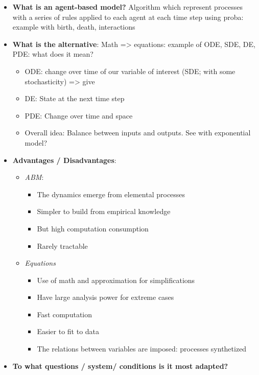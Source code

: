 \documentclass[
]{book}
\providecommand{\tightlist}{%
  \setlength{\itemsep}{0pt}\setlength{\parskip}{0pt}}
\theoremstyle{definition}
\theoremstyle{definition}
\theoremstyle{definition}
\theoremstyle{definition}
\theoremstyle{remark}
\begin{document}
\begin{itemize}
\tightlist
\item
  \textbf{What is an agent-based model?} Algorithm which represent processes with a series of rules applied to each agent at each time step using proba: example with birth, death, interactions
\item
  \textbf{What is the alternative}: Math =\textgreater{} equations: example of ODE, SDE, DE, PDE: what does it mean?

  \begin{itemize}
  \tightlist
  \item
    ODE: change over time of our variable of interest (SDE; with some stochasticity) =\textgreater{} give
  \item
    DE: State at the next time step
  \item
    PDE: Change over time and space
  \item
    Overall idea: Balance between inputs and outputs. See with exponential model?
  \end{itemize}
\item
  \textbf{Advantages / Disadvantages}:

  \begin{itemize}
  \tightlist
  \item
    \emph{ABM}:

    \begin{itemize}
    \tightlist
    \item
      The dynamics emerge from elemental processes
    \item
      Simpler to build from empirical knowledge
    \item
      But high computation consumption
    \item
      Rarely tractable
    \end{itemize}
  \item
    \emph{Equations}

    \begin{itemize}
    \tightlist
    \item
      Use of math and approximation for simplifications
    \item
      Have large analysis power for extreme cases
    \item
      Fast computation
    \item
      Easier to fit to data
    \item
      The relations between variables are imposed: processes synthetized
    \end{itemize}
  \end{itemize}
\item
  \textbf{To what questions / system/ conditions is it most adapted?}


\end{itemize}
\end{document}
